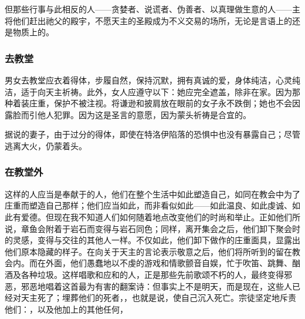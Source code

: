 但那些行事与此相反的人——贪婪者、说谎者、伪善者、以真理做生意的人——主将他们赶出祂父的殿宇，不愿天主的圣殿成为不义交易的场所，无论是言语上的还是物质上的。\par


\subsubsection{去教堂}

男女去教堂应衣着得体，步履自然，保持沉默，拥有真诚的爱，身体纯洁，心灵纯洁，适于向天主祈祷。此外，女人应遵守以下：她应完全遮盖，除非在家。因为那种着装庄重，保护不被注视。将谦逊和披肩放在眼前的女子永不跌倒；她也不会因露脸而引他人犯罪。因为这是圣言的意愿，因为蒙头祈祷是合宜的。\par

据说的妻子，由于过分的得体，即使在特洛伊陷落的恐惧中也没有暴露自己；尽管逃离大火，仍蒙着头。\par


\subsubsection{在教堂外}

这样的人应当是奉献于的人，他们在整个生活中如此塑造自己，如同在教会中为了庄重而塑造自己那样；他们应当如此，而非看似如此——如此温良、如此虔诚、如此有爱德。但现在我不知道人们如何随着地点改变他们的时尚和举止。正如他们所说，章鱼会附着于岩石而变得与岩石同色；同样，离开集会之后，他们卸下聚会时的灵感，变得与交往的其他人一样。不仅如此，他们卸下做作的庄重面具，显露出他们原本隐藏的样子。在向关于天主的言论表示敬意之后，他们将所听到的留在教会内。而在外面，他们愚蠢地以不虔的游戏和情歌颤音自娱，忙于吹笛、跳舞、酗酒及各种垃圾。这样唱歌和应和的人，正是那些先前歌颂不朽的人，最终变得邪恶，邪恶地唱着这首最为有害的翻案诗：但事实上不是明天，而是现在，这些人已经对天主死了；埋葬他们的死者，，也就是说，使自己沉入死亡。宗徒坚定地斥责他们：，以及他加上的其他任何，\par


